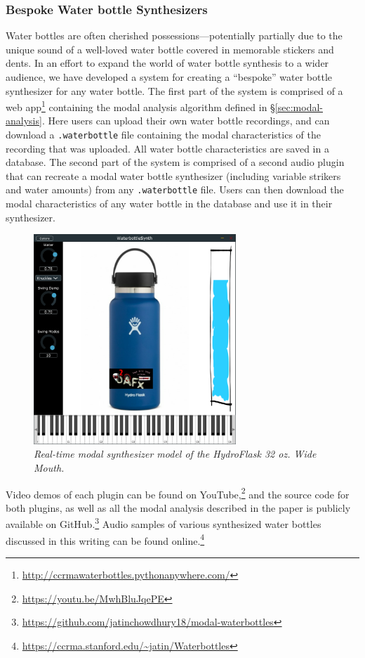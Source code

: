 \documentclass[twoside,a4paper]{article}
\begin{document}
\subsubsection{Bespoke Water bottle Synthesizers}
Water bottles are often cherished possessions---potentially partially due to the unique sound of a well-loved water bottle covered in memorable stickers and dents. In an effort to expand the world of water bottle synthesis to a wider
audience, we have developed a system for creating a ``bespoke''
water bottle synthesizer for any water bottle. The first part of the
system is comprised of a web app\footnote{\url{http://ccrmawaterbottles.pythonanywhere.com/}}
containing the modal analysis algorithm defined in \S\ref{sec:modal-analysis}. 
Here users can upload their own water bottle recordings, and can download a
\texttt{.waterbottle} file containing the modal characteristics of the
recording that was uploaded. All water bottle characteristics are saved in 
a database. The second part of the system is comprised of
a second audio plugin that can recreate a modal water bottle synthesizer
(including variable strikers and water amounts) from any \texttt{.waterbottle}
file. Users can then download the modal characteristics of any water
bottle in the database and use it in their synthesizer.
%
\begin{figure}
    \centering
    \includegraphics[width=3in]{../Figures/WaterbottleSynthPlugin.png}
    \caption{\it{Real-time modal synthesizer model of the HydroFlask
    32 oz. Wide Mouth.}}
    \label{fig:plugin}
\end{figure}

Video demos of each plugin can be found on
YouTube,\footnote{\url{https://youtu.be/MwhBluJqePE}}
and the source code for both plugins, as well as all the modal
analysis described in the paper is publicly available on
GitHub.\footnote{\url{https://github.com/jatinchowdhury18/modal-waterbottles}}
Audio samples of various synthesized water bottles discussed in this
writing can be found online.\footnote{\url{https://ccrma.stanford.edu/~jatin/Waterbottles}}
\end{document}
